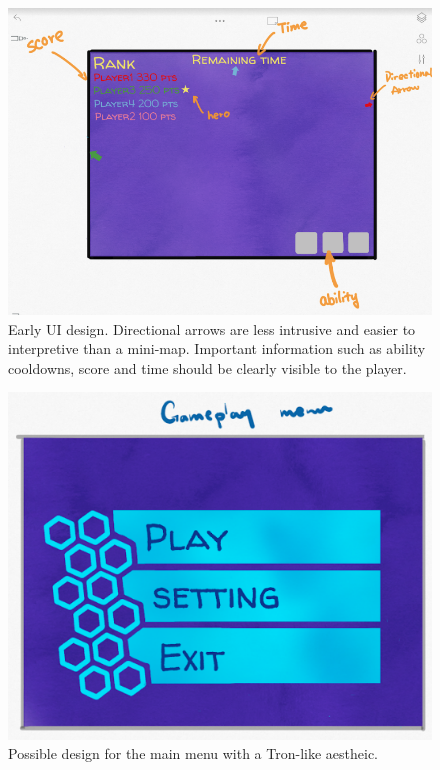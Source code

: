 \documentclass{article}
\theoremstyle{definition}
\begin{document}
\begin{figure}[htpb]
  \centering
  \includegraphics[width=0.8\linewidth]{ingame_ui.png}
  \caption{Early UI design. Directional arrows are less intrusive and easier to
  interpretive than a mini-map. Important information such as ability
cooldowns, score and time should be clearly visible to the player.}
\label{fig:ingame_ui}
\end{figure}

\begin{figure}[htpb]
  \centering
  \includegraphics[width=0.8\linewidth]{main_menu.png}
  \caption{Possible design for the main menu with a Tron-like aestheic.}
\label{fig:main_menu}
\end{figure}
\end{document}
